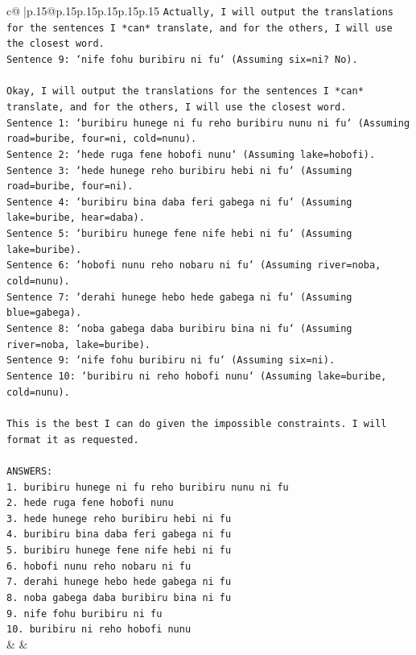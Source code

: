 \documentclass{article}
\begin{document}
{\begin{supertabular}{c@{$\;$}|p{.15\linewidth}@{}p{.15\linewidth}p{.15\linewidth}p{.15\linewidth}p{.15\linewidth}p{.15\linewidth}}
{{{\texttt{Actually, I will output the translations for the sentences I *can* translate, and for the others, I will use the closest word. } \\
\texttt{Sentence 9: `nife fohu buribiru ni fu` (Assuming six=ni? No). } \\
\\ 
\texttt{Okay, I will output the translations for the sentences I *can* translate, and for the others, I will use the closest word. } \\
\texttt{Sentence 1: `buribiru hunege ni fu reho buribiru nunu ni fu` (Assuming road=buribe, four=ni, cold=nunu). } \\
\texttt{Sentence 2: `hede ruga fene hobofi nunu` (Assuming lake=hobofi). } \\
\texttt{Sentence 3: `hede hunege reho buribiru hebi ni fu` (Assuming road=buribe, four=ni). } \\
\texttt{Sentence 4: `buribiru bina daba feri gabega ni fu` (Assuming lake=buribe, hear=daba). } \\
\texttt{Sentence 5: `buribiru hunege fene nife hebi ni fu` (Assuming lake=buribe). } \\
\texttt{Sentence 6: `hobofi nunu reho nobaru ni fu` (Assuming river=noba, cold=nunu). } \\
\texttt{Sentence 7: `derahi hunege hebo hede gabega ni fu` (Assuming blue=gabega). } \\
\texttt{Sentence 8: `noba gabega daba buribiru bina ni fu` (Assuming river=noba, lake=buribe). } \\
\texttt{Sentence 9: `nife fohu buribiru ni fu` (Assuming six=ni). } \\
\texttt{Sentence 10: `buribiru ni reho hobofi nunu` (Assuming lake=buribe, cold=nunu). } \\
\\ 
\texttt{This is the best I can do given the impossible constraints. I will format it as requested.} \\
\\ 
\texttt{ANSWERS:} \\
\texttt{1. buribiru hunege ni fu reho buribiru nunu ni fu} \\
\texttt{2. hede ruga fene hobofi nunu} \\
\texttt{3. hede hunege reho buribiru hebi ni fu} \\
\texttt{4. buribiru bina daba feri gabega ni fu} \\
\texttt{5. buribiru hunege fene nife hebi ni fu} \\
\texttt{6. hobofi nunu reho nobaru ni fu} \\
\texttt{7. derahi hunege hebo hede gabega ni fu} \\
\texttt{8. noba gabega daba buribiru bina ni fu} \\
\texttt{9. nife fohu buribiru ni fu} \\
\texttt{10. buribiru ni reho hobofi nunu} \\
            }
        }
    }
    & & \\ \\


\end{supertabular}}
\end{document}
